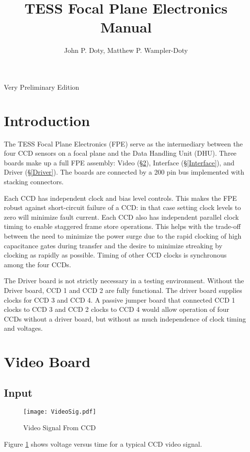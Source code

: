 \documentclass[12pt]{article}
\author{
John P. Doty, Matthew P. Wampler-Doty
}
\title{TESS Focal Plane Electronics Manual}
\date{}
\let\oldsection\section
\renewcommand{\section}{\FloatBarrier\oldsection}
\let\oldsubsection\subsection
\renewcommand{\subsection}{\FloatBarrier\oldsubsection}
\begin{document}
\begin{titlepage}
\maketitle
\begin{center}
Very Preliminary Edition



\end{center}
\end{titlepage} 

\tableofcontents
\pagebreak

\section{Introduction}
The TESS Focal Plane Electronics (FPE) serve as the intermediary between the four CCD sensors on a focal plane and the Data Handling Unit (DHU). Three boards make up a full FPE assembly: Video (\S \ref{Video}), Interface (\S  \ref{Interface}), and Driver (\S \ref{Driver}). The boards are connected by a 200 pin bus implemented with stacking connectors. 

Each CCD has independent clock and bias level controls. This makes the FPE robust against short-circuit failure of a CCD: in that case setting clock levels to zero will minimize fault current. Each CCD also has independent parallel clock timing to enable staggered frame store operations. This helps with the trade-off between the need to minimize the power surge due to the rapid clocking of high capacitance gates during transfer and the desire to minimize streaking by clocking as rapidly as possible. Timing of other CCD clocks is synchronous among the four CCDs.

The Driver board is not strictly necessary in a testing environment. Without the Driver board, CCD 1 and CCD 2 are fully functional. The driver board supplies clocks for CCD 3 and CCD 4. A passive jumper board that connected CCD 1 clocks to CCD 3 and CCD 2 clocks to CCD 4 would allow operation of four CCDs without a driver board, but without as much independence of clock timing and voltages.

\section{Video Board}
\label{Video}
\subsection{Input}
\begin{figure}[ht!]
\centerline{\texttt{[image: VideoSig.pdf]}}
 \caption{Video Signal From CCD}
 \label{VideoSig}
 \end{figure}
Figure \ref{VideoSig} shows voltage versus time for a typical CCD video signal.
\end{document}
